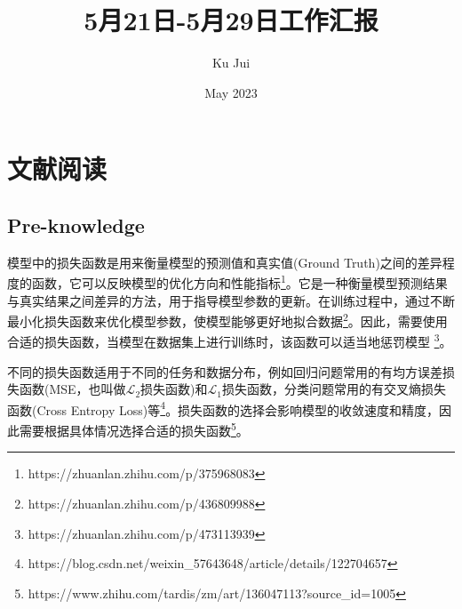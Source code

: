 \documentclass[letterpaper,12pt]{article}
\begin{document}
	
	
	\title{\songti {}5月21日-5月29日工作汇报}
	\author{\textrm{Ku Jui}}
	\date{\textrm{May 2023}}
	\maketitle
	
	\renewcommand{\figurename}{Figure} %
	\renewcommand{\contentsname}{Contents}
	\renewcommand{\tablename}{Table}
	\tableofcontents  %
	
	\section{文献阅读}
	
	\subsection{Pre-knowledge}
	
	模型中的损失函数是用来衡量模型的预测值和真实值(Ground Truth)之间的差异程度的函数，它可以反映模型的优化方向和性能指标\footnote{https://zhuanlan.zhihu.com/p/375968083}。它是一种衡量模型预测结果与真实结果之间差异的方法，用于指导模型参数的更新。在训练过程中，通过不断最小化损失函数来优化模型参数，使模型能够更好地拟合数据\footnote{https://zhuanlan.zhihu.com/p/436809988}。因此，需要使用合适的损失函数，当模型在数据集上进行训练时，该函数可以适当地惩罚模型 \footnote{https://zhuanlan.zhihu.com/p/473113939}。
	
	不同的损失函数适用于不同的任务和数据分布，例如回归问题常用的有均方误差损失函数(MSE，也叫做$\mathcal{L}_{2}$损失函数)和$\mathcal{L}_{1}$损失函数，分类问题常用的有交叉熵损失函数(Cross Entropy Loss)等\footnote{https://blog.csdn.net/weixin\_57643648/article/details/122704657}。损失函数的选择会影响模型的收敛速度和精度，因此需要根据具体情况选择合适的损失函数\footnote{https://www.zhihu.com/tardis/zm/art/136047113?source\_id=1005}。
	
\end{document}
